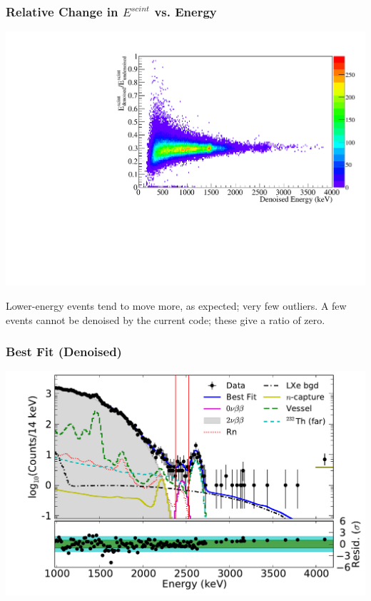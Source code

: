 \documentclass{beamer}
\begin{document}
\begin{frame}
\begin{center}
\frametitle{Relative Change in $E^{scint}$ vs. Energy}
\end{center}
\vspace{0.7cm}%
\begin{center}
\includegraphics[keepaspectratio=true,width=\textwidth,clip=true,trim=0mm 0mm 0mm 10mm]{EventComparison_ratio_vs_E.pdf}
\end{center}
\vspace{-0.3cm}%
Lower-energy events tend to move more, as expected; very few outliers.
A few events cannot be denoised by the current code; these give a ratio of zero.
\end{frame}

\begin{frame}
\begin{center}
\frametitle{Best Fit (Denoised)}
\end{center}
\vspace{0.6cm}
\begin{center}
\includegraphics[keepaspectratio=true,width=\textwidth,clip=true,trim=14mm 0mm 0mm 0mm]{Energy_BestFit_ss.pdf}
\end{center}
\end{frame}
\end{document}
